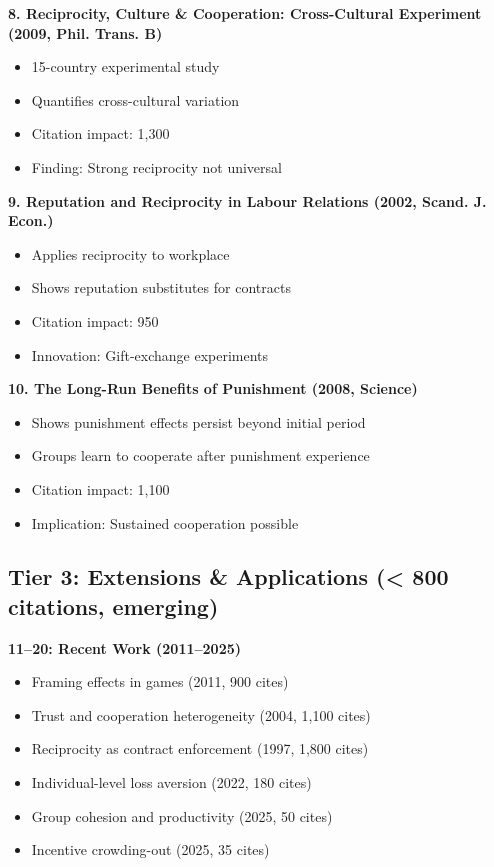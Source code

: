 \documentclass[11pt]{article}
\begin{document}
\textbf{8. Reciprocity, Culture \& Cooperation: Cross-Cultural Experiment (2009, Phil. Trans. B)}
\begin{itemize}
    \item 15-country experimental study
    \item Quantifies cross-cultural variation
    \item Citation impact: 1,300
    \item Finding: Strong reciprocity not universal
\end{itemize}

\textbf{9. Reputation and Reciprocity in Labour Relations (2002, Scand. J. Econ.)}
\begin{itemize}
    \item Applies reciprocity to workplace
    \item Shows reputation substitutes for contracts
    \item Citation impact: 950
    \item Innovation: Gift-exchange experiments
\end{itemize}

\textbf{10. The Long-Run Benefits of Punishment (2008, Science)}
\begin{itemize}
    \item Shows punishment effects persist beyond initial period
    \item Groups learn to cooperate after punishment experience
    \item Citation impact: 1,100
    \item Implication: Sustained cooperation possible
\end{itemize}

\subsection*{Tier 3: Extensions \& Applications (< 800 citations, emerging)}

\textbf{11–20: Recent Work (2011–2025)}
\begin{itemize}
    \item Framing effects in games (2011, 900 cites)
    \item Trust and cooperation heterogeneity (2004, 1,100 cites)
    \item Reciprocity as contract enforcement (1997, 1,800 cites)
    \item Individual-level loss aversion (2022, 180 cites)
    \item Group cohesion and productivity (2025, 50 cites)
    \item Incentive crowding-out (2025, 35 cites)
\end{itemize}
\end{document}
